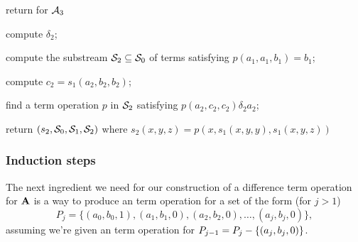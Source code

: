 \LinesNumbered
\begin{algorithm}

  \caption{return \ldt for $\mathcal{A}_3$
  \label{alg:stream-ldt3}  }

compute $\delta_2$;

compute the substream $\mathcal{S}_2 \subseteq \mathcal{S}_0$ of terms satisfying
 $p(a_1,a_1,b_1) = b_1$;

compute $c_2 = s_1(a_2, b_2, b_2)$;

find a term operation $p$ in $\mathcal{S}_2$ satisfying 
$p(a_2, c_2, c_2) \mathrel{\delta_2} a_2$;

return $(s_2, \mathcal{S}_0, \mathcal{S}_1, \mathcal{S}_2)$ where $s_2(x,y,z) = p(x, s_1(x,y,y), s_1(x,y,z))$
\end{algorithm}



















\subsubsection{Induction steps}
\label{sec:induct}

The next ingredient we need for our construction of a 
difference term operation for $\mathbf{A}$ 
is 
a way to produce an \ld
term operation for a set of the form  (for $j>1$)
\begin{equation}
\label{eqn:Pj}
P_j = \{(a_0, b_0, 1), (a_1, b_1, 0), (a_2, b_2, 0), \dots, 
(a_j, b_j, 0)\},
\end{equation}
assuming we're given an \ld term operation for $P_{j-1} = P_{j} - \{(a_j, b_j, 0)\}$.  


\begin{comment}
\noindent \underline{\bf Subroutine \ild-0}\\[4pt]
The input, $p$,  is
an \ld term operation for $P_{j-1} = P_{j} \mysetminus \{(a_j, b_j, 0)\}$.  
\begin{enumerate}[1.]
\item 
Call Subroutine \ld-2 to 
compute an \ld term operation $t$ for the set
\begin{equation*}
\{(a_0, b_0, 1), (a_j, p(a_j, b_j, b_j), 0)\}.
\end{equation*}
\item Return the following 
\ld term operation for $P_j$: 
\begin{equation}
d(x,y,z) = t(x, p(x,y,y), p(x,y,z)).
\label{eq:idl0-dto}
\end{equation}
\end{enumerate}
\qed
\end{comment}




